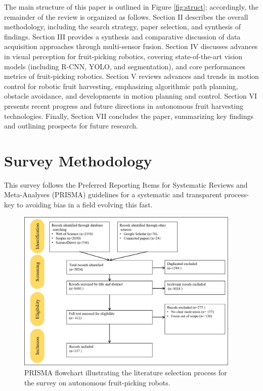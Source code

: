 \documentclass[pdflatex,sn-mathphys-num]{sn-jnl}
\begin{document}
The main structure of this paper is outlined in Figure \ref{fig:struct}; accordingly, the remainder of the review is organized as follows. Section II describes the overall methodology, including the search strategy, paper selection, and synthesis of findings. Section III provides a synthesis and comparative discussion of data acquisition approaches through multi-sensor fusion.
Section IV discusses advances in visual perception for fruit-picking robotics, covering state-of-the-art vision models (including R-CNN, YOLO, and segmentation), and core performances metrics of fruit-picking robotics. Section V reviews advances and trends in motion control for robotic fruit harvesting, emphasizing algorithmic path planning, obstacle avoidance, and developments in motion planning and control. Section VI presents recent progress and future directions in autonomous fruit harvesting technologies. Finally, Section VII concludes the paper, summarizing key findings and outlining prospects for future research.



\section{Survey Methodology}
This survey follows the Preferred Reporting Items for Systematic Reviews and Meta-Analyses (PRISMA) guidelines \cite{page2021prisma} for a systematic and transparent process-key to avoiding bias in a field evolving this fast. 

\begin{figure}[h!]
    \centering
    \includegraphics[width=0.95\textwidth]{fig_prisma1.png}
    \caption{ PRISMA flowchart illustrating the literature selection process for the survey on autonomous fruit-picking robots. 
    }
    \label{fig:prisma1}
\end{figure}
\end{document}
